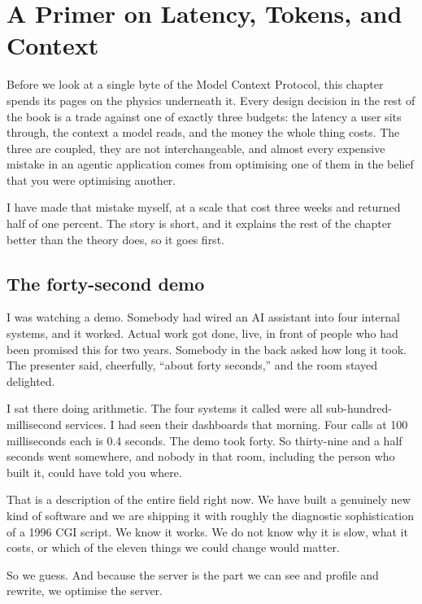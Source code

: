 \chapter{A Primer on Latency, Tokens, and Context}
\label{ch:primer}

Before we look at a single byte of the Model Context Protocol, this chapter
spends its pages on the physics underneath it. Every design decision in the rest
of the book is a trade against one of exactly three budgets: the latency a user
sits through, the context a model reads, and the money the whole thing costs.
The three are coupled, they are not interchangeable, and almost every expensive
mistake in an agentic application comes from optimising one of them in the
belief that you were optimising another.

I have made that mistake myself, at a scale that cost three weeks and returned
half of one percent. The story is short, and it explains the rest of the chapter
better than the theory does, so it goes first.

\section{The forty-second demo}

I was watching a demo. Somebody had wired an AI assistant into four internal
systems, and it worked. Actual work got done, live, in front of people who had
been promised this for two years. Somebody in the back asked how long it took.
The presenter said, cheerfully, ``about forty seconds,'' and the room stayed
delighted.

I sat there doing arithmetic. The four systems it called were all
sub-hundred-millisecond services. I had seen their dashboards that morning. Four
calls at 100 milliseconds each is 0.4 seconds. The demo took forty. So
thirty-nine and a half seconds went somewhere, and nobody in that room, including
the person who built it, could have told you where.

That is a description of the entire field right now. We have built a genuinely new kind of software and we are shipping it with
roughly the diagnostic sophistication of a 1996 CGI script. We know it works. We
do not know why it is slow, what it costs, or which of the eleven things we could
change would matter.

So we guess. And because the server is the part we can see and profile and
rewrite, we optimise the server.


